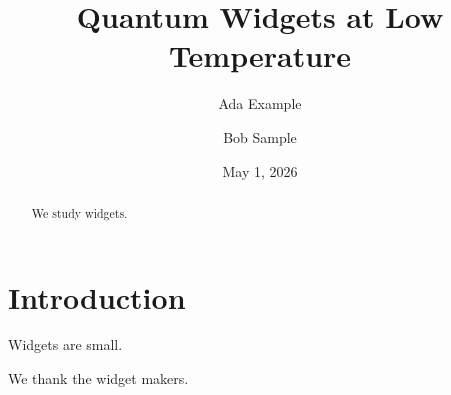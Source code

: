 \documentclass[aps,prl,twocolumn]{revtex4-2}
\begin{document}
\title{Quantum Widgets at Low Temperature}
\author{Ada Example}
\author{Bob Sample}
\date{May 1, 2026}
\begin{abstract}
We study widgets.
\end{abstract}
\maketitle
\section{Introduction}
Widgets are small.
\begin{acknowledgments}
We thank the widget makers.
\end{acknowledgments}
\end{document}
